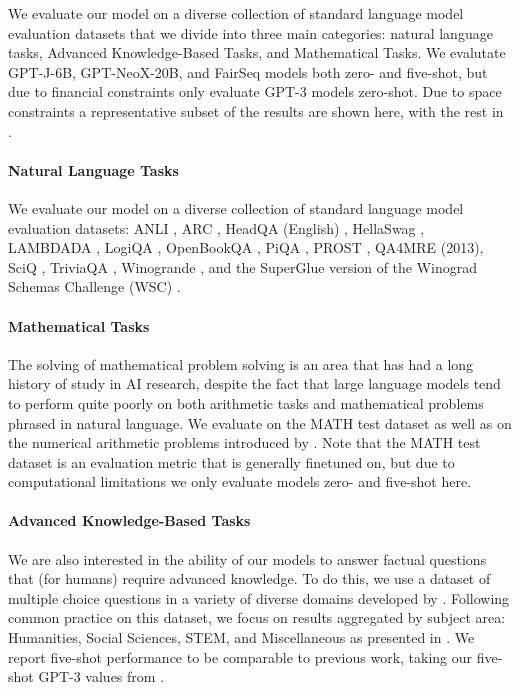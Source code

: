 \documentclass[11pt]{article}
\newcommand{\model}{GPT-NeoX-20B}
\begin{document}
We evaluate our model on a diverse collection of standard language model evaluation datasets that we divide into three main categories: natural language tasks, Advanced Knowledge-Based Tasks, and Mathematical Tasks. We evalutate GPT-J-6B, \model{}, and FairSeq models both zero- and five-shot, but due to financial constraints only evaluate GPT-3 models zero-shot. Due to space constraints a representative subset of the results are shown here, with the rest in .

\paragraph{Natural Language Tasks} We evaluate our model on a diverse collection of standard language model evaluation datasets: ANLI \citep{nie2020adversarial}, ARC \citep{clark2018think}, HeadQA (English) \citep{vilares2019head}, HellaSwag \citep{zellers2019hellaswag}, LAMBDADA \citep{paperno2016lambada}, LogiQA \citep{liu2021logiqa}, OpenBookQA \citep{mihaylov2018can}, PiQA \citep{bisk2020piqa}, PROST \citep{aroca2021prost}, QA4MRE \citep{penas2013qa4mre} (2013), SciQ \citep{welbl2017crowdsourcing}, TriviaQA \citep{joshi2017triviaqa}, Winogrande \citep{sakaguchi2020winogrande}, and the SuperGlue version of the Winograd Schemas Challenge (WSC) \citep{wang2019superglue}.

\paragraph{Mathematical Tasks} The solving of mathematical problem solving is an area that has had a long history of study in AI research, despite the fact that large language models tend to perform quite poorly on both arithmetic tasks and mathematical problems phrased in natural language. We evaluate on the MATH test dataset \citep{hendrycks2021measuring} as well as on the numerical arithmetic problems introduced by \citet{brown2020language}. Note that the MATH test dataset is an evaluation metric that is generally finetuned on, but due to computational limitations we only evaluate models zero- and five-shot here.

\paragraph{Advanced Knowledge-Based Tasks} We are also interested in the ability of our models to answer factual questions that (for humans) require advanced knowledge. To do this, we use a dataset of multiple choice questions in a variety of diverse domains developed by \citet{hendrycks2020measuring}. Following common practice on this dataset, we focus on results aggregated by subject area: Humanities, Social Sciences, STEM, and Miscellaneous as presented in . We report five-shot performance to be comparable to previous work, taking our five-shot GPT-3 values from \citet{hendrycks2020measuring}.
\end{document}
